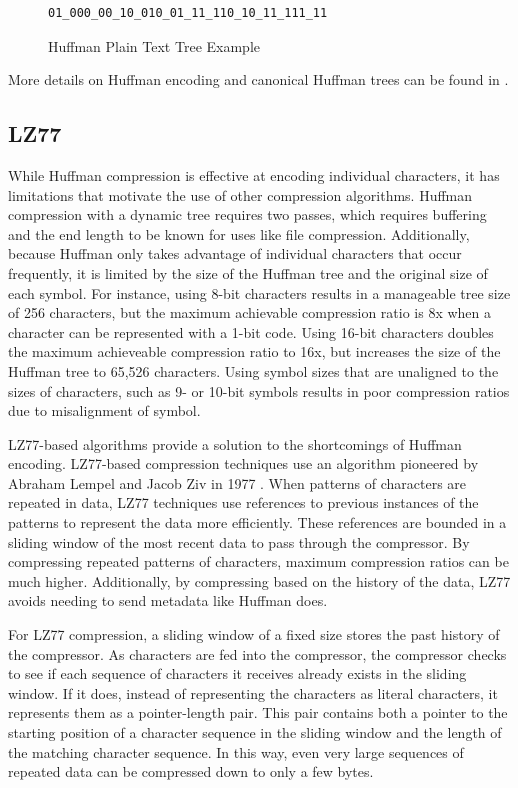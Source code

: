 \documentclass[doublespace,nopageskip]{VTthesis}
\begin{document}
\begin{figure}[htb]
	\centering
    \begin{lstlisting}
01_000_00_10_010_01_11_110_10_11_111_11
    \end{lstlisting}
	\caption{Huffman Plain Text Tree Example}
	\label{fig:huffman_plain_text}
\end{figure}

More details on Huffman encoding and canonical Huffman trees can be found in \cite{huffman, canonicalhuffman}.

\subsection{LZ77}\label{ss:lz77}
While Huffman compression is effective at encoding individual characters, it has limitations that motivate the use of other compression algorithms. Huffman compression with a dynamic tree requires two passes, which requires buffering and the end length to be known for uses like file compression. Additionally, because Huffman only takes advantage of individual characters that occur frequently, it is limited by the size of the Huffman tree and the original size of each symbol. For instance, using 8-bit characters results in a manageable tree size of 256 characters, but the maximum achievable compression ratio is 8x when a character can be represented with a 1-bit code. Using 16-bit characters doubles the maximum achieveable compression ratio to 16x, but increases the size of the Huffman tree to 65,526 characters. Using symbol sizes that are unaligned to the sizes of characters, such as 9- or 10-bit symbols results in poor compression ratios due to misalignment of symbol.

LZ77-based algorithms provide a solution to the shortcomings of Huffman encoding. LZ77-based compression techniques use an algorithm pioneered by Abraham Lempel and Jacob Ziv in 1977 \cite{lz77}. When patterns of characters are repeated in data, LZ77 techniques use references to previous instances of the patterns to represent the data more efficiently. These references are bounded in a sliding window of the most recent data to pass through the compressor. By compressing repeated patterns of characters, maximum compression ratios can be much higher. Additionally, by compressing based on the history of the data, LZ77 avoids needing to send metadata like Huffman does.

For LZ77 compression, a sliding window of a fixed size stores the past history of the compressor. As characters are fed into the compressor, the compressor checks to see if each sequence of characters it receives already exists in the sliding window. If it does, instead of representing the characters as literal characters, it represents them as a pointer-length pair. This pair contains both a pointer to the starting position of a character sequence in the sliding window and the length of the matching character sequence. In this way, even very large sequences of repeated data can be compressed down to only a few bytes.
\end{document}
